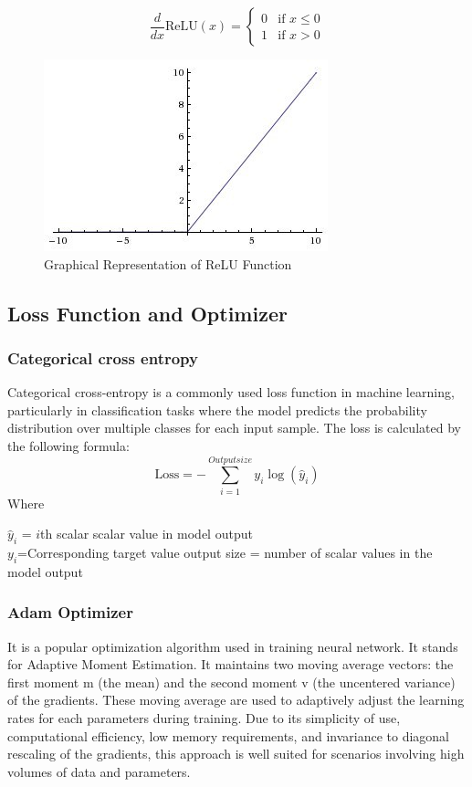 \documentclass{ioereport}
\begin{document}
\begin{equation}
\frac{d}{dx} \text{ReLU}(x) = 
\begin{cases} 
0 & \text{if } x \leq 0 \\
1 & \text{if } x > 0
\end{cases}
\end{equation}

\begin{figure}[H]
    \centering
    \includegraphics[scale=1]{images/RELU.jpg}
    \caption{Graphical Representation of ReLU Function}
    \label{fig:relu-}
\end{figure}



\subsection{Loss Function and Optimizer}
\subsubsection{Categorical cross entropy}
Categorical cross-entropy is a commonly used loss function in machine learning,
particularly in classification tasks where the model predicts the probability distribution
over multiple classes for each input sample. The loss is calculated by the following
formula:
\begin{equation}
\text{Loss} = -\sum_{i=1}^{Output size} y_i \log(\hat{y}_i)
\end{equation}
Where

\(\hat{y}_i\) = \(i\)th scalar scalar value in model output\\
\( y_i \)=Corresponding target value
output size = number of scalar values in the model output

\subsubsection{Adam Optimizer}
It is a popular optimization algorithm used in training neural network. It stands for
Adaptive Moment Estimation. It maintains two moving average vectors: the first
moment m (the mean) and the second moment v (the uncentered variance) of the
gradients. These moving average are used to adaptively adjust the learning rates for each parameters during training. Due to its simplicity of use, computational efficiency,
low memory requirements, and invariance to diagonal rescaling of the gradients, this
approach is well suited for scenarios involving high volumes of data and parameters.
\end{document}
